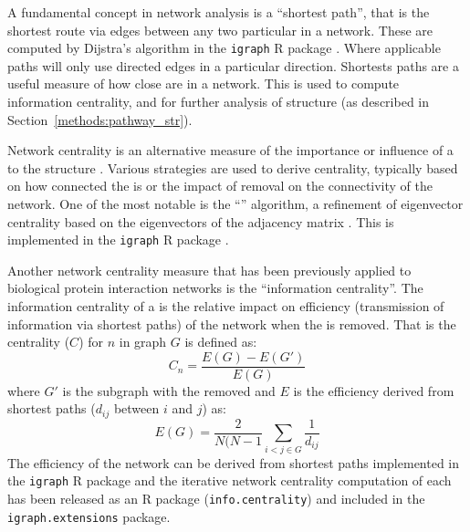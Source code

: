 A fundamental concept in network analysis is a ``\gls{shortest path}'', that is the shortest route via \glspl{edge} between any two particular  in a network. These are computed by Dijstra's algorithm \citep{Dijkstra1959} in the \texttt{igraph} R package \citep{igraph}. Where applicable paths will only use directed \glspl{edge} in a particular direction. Shortests paths are a useful measure of how close  are in a network. This is used to compute \gls{information centrality}, and for further analysis of  structure (as described in Section~\ref{methods:pathway_str}).

Network \gls{centrality} is an alternative measure of the importance or influence of a  to the  structure \citep{Borgatti2005}. Various strategies are used to derive centrality,  typically based on how connected the  is or the impact of  removal on the connectivity of the network. One of the most notable is the ``'' algorithm, a refinement of eigenvector \gls{centrality} based on the eigenvectors of the adjacency matrix \citep{Brin1998}. This is implemented in the \texttt{igraph} R package \citep{igraph}.

Another network \gls{centrality} measure that has been previously applied to biological protein interaction networks \citep{Kranthi2013} is the ``\gls{information centrality}''. The \gls{information centrality} of a  is the relative impact on efficiency (transmission of information via \glspl{shortest path}) of the network when the  is removed. That is the \gls{centrality} ($C$) \citep{Kranthi2013} for  $n$ in graph $G$ is defined as: $$C_n = \frac{E(G)-E(G')}{E(G)}$$ where $G'$ is the subgraph with the  removed and $E$ is the efficiency \citep{Latora2001} derived from \glspl{shortest path} ($d_{ij}$ between  $i$ and $j$) as: $$E(G) = \frac{2}{N(N-1} \sum_{i<j \in G}^{} \frac{1}{d_{ij}}$$ The efficiency of the network can be derived from \glspl{shortest path} implemented in the \texttt{igraph} R package and the iterative network \gls{centrality} computation of each  has been released as an R package (\texttt{info.centrality}) and included in the \texttt{igraph.extensions} package.

